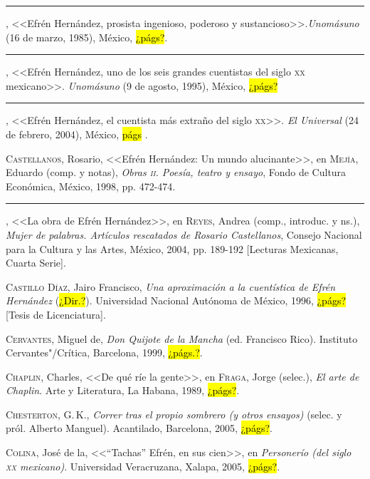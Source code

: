 \documentclass[14pt,twoside,final]{extbook} %
\begin{document}
\rule{1cm}{0.4pt}, <<Efrén Hernández, prosista ingenioso, poderoso y sustancioso>>.\newline \emph{Unomásuno} (16 de marzo, 1985), México, \hl{¿págs?}.\label{bib:carballo1985}

\rule{1cm}{0.4pt}, <<Efrén Hernández, uno de los seis grandes cuentistas del siglo \textsc{xx} mexicano>>. \emph{Unomásuno} (9 de agosto, 1995), México, \hl{¿págs?}\label{bib:carballo1995}

\rule{1cm}{0.4pt}, <<Efrén Hernández, el cuentista más extraño del siglo \textsc{xx}>>. \emph{El Universal} (24 de febrero, 2004), México, \hl{págs} .\label{bib:carballo2004}

\textsc{Castellanos}, Rosario, <<Efrén Hernández: Un mundo alucinante>>, en \textsc{Mejía}, Eduardo (comp. y notas), \emph{Obras \textsc{ii}. Poesía, teatro y ensayo}, Fondo de Cultura Económica, México, 1998, pp. 472-474.\label{bib:castellanos1998}

\rule{1cm}{0.4pt}, <<La obra de Efrén Hernández>>, en \textsc{Reyes}, Andrea (comp., introduc. y ns.), \emph{Mujer de palabras. Artículos rescatados de Rosario Castellanos}, Consejo Nacional para la Cultura y las Artes, México, 2004, pp. \mbox{189-192} [Lecturas Mexicanas, Cuarta Serie].\label{bib:castellanos2004}

\textsc{Castillo Díaz}, Jairo Francisco, \emph{Una aproximación a la cuentística de Efrén Hernández} (\hl{¿Dir.?}). Universidad Nacional Autónoma de México, 1996, \hl{¿págs?} [Tesis de Licenciatura].\label{bib:castillo1996}

\textsc{Cervantes}, Miguel de, \emph{Don Quijote de la Mancha} (ed. Francisco Rico). Instituto Cervantes"/Crítica, Barcelona, 1999, \hl{¿págs.?}.\label{bib:cervantes1999}

\textsc{Chaplin}, Charles, <<De qué ríe la gente>>, en \textsc{Fraga}, Jorge (selec.), \emph{El arte de Chaplin}. Arte y Literatura, La Habana, 1989, \hl{¿págs?}.\label{bib:chaplin1989}

\textsc{Chesterton}, G.\,K., \emph{Correr tras el propio sombrero (y otros ensayos)} (selec. y pról. Alberto Manguel). Acantilado, Barcelona, 2005, \hl{¿págs?}.\label{bib:chesterton2005}

\textsc{Colina}, José de la, <<``Tachas'' Efrén, en sus cien>>, en \emph{Personerío (del siglo \textsc{xx} mexicano)}. Universidad Veracruzana, Xalapa, 2005, \hl{¿págs?}.\label{bib:colina2005}
\end{document}
